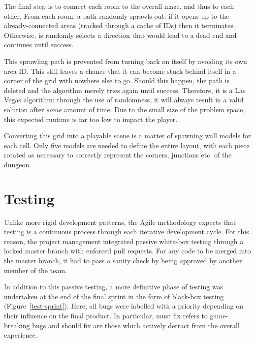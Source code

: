 \documentclass[a4paper, oneside, 11pt]{report}
\begin{document}
The final step is to connect each room to the overall maze, and thus to each other. From each room, a path randomly sprawls out: if it opens up to the already-connected areas (tracked through a cache of IDs) then it terminates. Otherwise, is randomly selects a direction that would lead to a dead end and continues until success.

This sprawling path is prevented from turning back on itself by avoiding its own area ID. This still leaves a chance that it can become stuck behind itself in a corner of the grid with nowhere else to go. Should this happen, the path is deleted and the algorithm merely tries again until success. Therefore, it is a Las Vegas algorithm: through the use of randomness, it will always result in a valid solution after \emph{some} amount of time. Due to the small size of the problem space, this expected runtime is far too low to impact the player.

Converting this grid into a playable scene is a matter of spawning wall models for each cell. Only five models are needed to define the entire layout, with each piece rotated as necessary to correctly represent the corners, junctions etc. of the dungeon.

\chapter{Testing}
Unlike more rigid development patterns, the Agile methodology expects that testing is a continuous process through each iterative development cycle. For this reason, the project management integrated passive white-box testing through a locked master branch with enforced pull requests. For any code to be merged into the master branch, it had to pass a sanity check by being approved by another member of the team.

In addition to this passive testing, a more definitive phase of testing was undertaken at the end of the final sprint in the form of black-box testing (Figure~\ref{test-sprint}). Here, all bugs were labelled with a priority depending on their influence on the final product. In particular, must fix refers to game-breaking bugs and should fix are those which actively detract from the overall experience.
\end{document}
